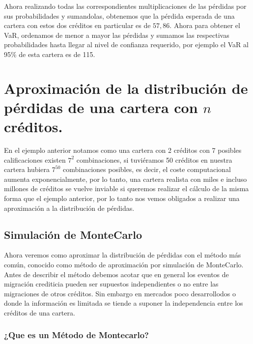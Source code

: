\documentclass[
  12pt,
]{krantz}
\theoremstyle{definition}
\theoremstyle{definition}
\theoremstyle{definition}
\theoremstyle{remark}
\begin{document}
Ahora realizando todas las correspondientes multiplicaciones de las pérdidas por sus probabilidades y sumandolas, obtenemos que la pérdida esperada de una cartera con estos dos créditos en particular es de \(57,86\). Ahora para obtener el VaR, ordenamos de menor a mayor las pérdidas y sumamos las respectivas probabilidades hasta llegar al nivel de confianza requerido, por ejemplo el VaR al 95\% de esta cartera es de 115.

\hypertarget{aproximacion-de-la-distribucion-de-perdidas-de-una-cartera-con-n-creditos.}{%
\section{\texorpdfstring{Aproximación de la distribución de pérdidas de una cartera con \(n\) créditos.}{Aproximación de la distribución de pérdidas de una cartera con n créditos.}}\label{aproximacion-de-la-distribucion-de-perdidas-de-una-cartera-con-n-creditos.}}

En el ejemplo anterior notamos como una cartera con 2 créditos con 7 posibles calificaciones existen \(7^2\) combinaciones, si tuviéramos 50 créditos en nuestra cartera hubiera \(7^{50}\) combinaciones posibles, es decir, el coste computacional aumenta exponencialmente, por lo tanto, una cartera realista con miles e incluso millones de créditos se vuelve inviable si queremos realizar el cálculo de la misma forma que el ejemplo anterior, por lo tanto nos vemos obligados a realizar una aproximación a la distribución de pérdidas.

\hypertarget{simulacion-de-montecarlo}{%
\subsection{Simulación de MonteCarlo}\label{simulacion-de-montecarlo}}

Ahora veremos como aproximar la distribución de pérdidas con el método más común, conocido como método de aproximación por simulación de MonteCarlo. Antes de describir el método debemos acotar que en general los eventos de migración crediticia pueden ser supuestos independientes o no entre las migraciones de otros créditos. Sin embargo en mercados poco desarrollodos o donde la información es limitada se tiende a suponer la independencia entre los créditos de una cartera.

\hypertarget{que-es-un-metodo-de-montecarlo}{%
\subsubsection{¿Que es un Método de Montecarlo?}\label{que-es-un-metodo-de-montecarlo}}
\end{document}
